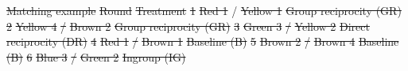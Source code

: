 \documentclass[12pt,a4paper]{article}
\providecommand{\DIFaddtex}[1]{{\protect\color{blue}\uwave{#1}}} %
\providecommand{\DIFdeltex}[1]{{\protect\color{red}\sout{#1}}}                      %
\providecommand{\DIFaddFL}[1]{\DIFadd{#1}} %
\providecommand{\DIFdelFL}[1]{\DIFdel{#1}} %
\providecommand{\DIFaddbeginFL}{} %
\providecommand{\DIFaddendFL}{} %
\providecommand{\DIFdelbeginFL}{} %
\providecommand{\DIFdelendFL}{} %
\providecommand{\DIFadd}[1]{\texorpdfstring{\DIFaddtex{#1}}{#1}} %
\providecommand{\DIFdel}[1]{\texorpdfstring{\DIFdeltex{#1}}{}} %
\begin{document}
{%
\DIFdelFL{Matching example}}%
\DIFdelFL{Round	}%
\DIFdelFL{Treatment	}%
\DIFdelFL{1	}%
\DIFdelFL{Red 1	}%
\DIFdelendFL \DIFaddbeginFL \DIFaddFL{214}\DIFaddendFL /\DIFdelbeginFL %
\DIFdelFL{Yellow 1	}%
\DIFdelFL{Group reciprocity (GR)}%
\DIFdelFL{2	}%
\DIFdelFL{Yellow 4	}%
\DIFdelFL{/	}%
\DIFdelFL{Brown 2	}%
\DIFdelFL{Group reciprocity (GR)	}%
\DIFdelFL{3	}%
\DIFdelFL{Green 3	}%
\DIFdelFL{/	}%
\DIFdelFL{Yellow 2	}%
\DIFdelFL{Direct reciprocity (DR)	}%
\DIFdelFL{4	}%
\DIFdelFL{Red 1	}%
\DIFdelFL{/	}%
\DIFdelFL{Brown 1	}%
\DIFdelFL{Baseline (B)	}%
\DIFdelFL{5	}%
\DIFdelFL{Brown 2	}%
\DIFdelFL{/	}%
\DIFdelFL{Brown 4	}%
\DIFdelFL{Baseline (B)	}%
\DIFdelFL{6	}%
\DIFdelFL{Blue 3	}%
\DIFdelFL{/	}%
\DIFdelFL{Green 2	}%
\DIFdelFL{Ingroup (IG)	}%
\end{document}
